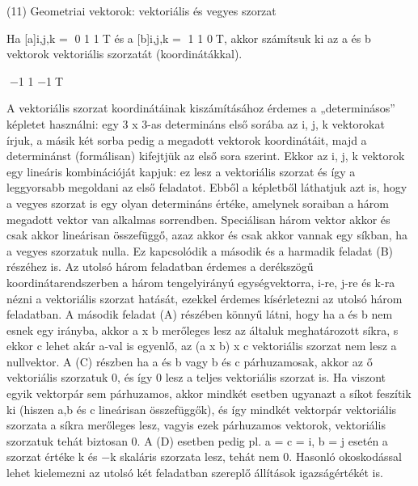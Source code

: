 \begin{frame}[plain]
\begin{tcolorbox}[center, colback={myyellow}, coltext={black}, colframe={myyellow}]
    {\RHuge  (11) Geometriai vektorok: vektoriális és vegyes szorzat }
    \mmedskip
\end{tcolorbox}
\end{frame}

\begin{frame}
  \begin{tcolorbox}[title={11/1. -N-}]
    Ha [a]i,j,k = 0 1 1T és a [b]i,j,k = 1 1 0T, akkor számítsuk ki az a és b vektorok vektoriális szorzatát (koordinátákkal).

  \tcblower

    \mmedskip 
    
    −1 1 −1T
  \end{tcolorbox}
\end{frame}


\begin{frame}
  \begin{tcolorbox}[title={11/1. -N-}]
    A vektoriális szorzat koordinátáinak kiszámításához érdemes a „determinásos” képletet használni: egy 3 x 3-as determináns első sorába az i, j, k vektorokat írjuk, a másik két sorba pedig a megadott vektorok koordinátáit, majd a determinánst (formálisan) kifejtjük az első sora szerint. Ekkor az i, j, k vektorok egy lineáris kombinációját kapjuk: ez lesz a vektoriális szorzat és így a leggyorsabb megoldani az első feladatot. Ebből a képletből láthatjuk azt is, hogy a vegyes szorzat is egy olyan determináns értéke, amelynek soraiban a három megadott vektor van alkalmas sorrendben. Speciálisan három vektor akkor és csak akkor lineárisan összefüggő, azaz akkor és csak akkor vannak egy síkban, ha a vegyes szorzatuk nulla. Ez kapcsolódik a második és a harmadik feladat (B) részéhez is. Az utolsó három feladatban érdemes a derékszögű koordinátarendszerben a három tengelyirányú egységvektorra, i-re, j-re és k-ra nézni a vektoriális szorzat hatását, ezekkel érdemes kísérletezni az utolsó három feladatban. A második feladat (A) részében könnyű látni, hogy ha a és b nem esnek egy irányba, akkor a x b merőleges lesz az általuk meghatározott síkra, s ekkor c lehet akár a-val is egyenlő, az (a x b) x c vektoriális szorzat nem lesz a nullvektor. A (C) részben ha a és b vagy b és c párhuzamosak, akkor az ő vektoriális szorzatuk 0, és így 0 lesz a teljes vektoriális szorzat is. Ha viszont egyik vektorpár sem párhuzamos, akkor mindkét esetben ugyanazt a síkot feszítik ki (hiszen a,b és c lineárisan összefüggők), és így mindkét vektorpár vektoriális szorzata a síkra merőleges lesz, vagyis ezek párhuzamos vektorok, vektoriális szorzatuk tehát biztosan 0. A (D) esetben pedig pl. a = c = i, b = j esetén a szorzat értéke k és −k skaláris szorzata lesz, tehát nem 0. Hasonló okoskodással lehet kielemezni az utolsó két feladatban szereplő állítások igazságértékét is.
  \end{tcolorbox}
\end{frame}


